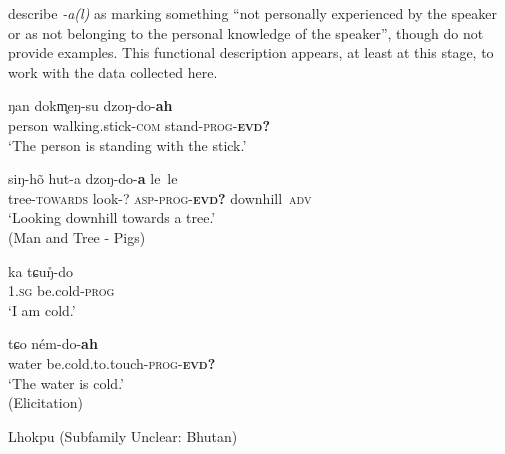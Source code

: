 \cite[20-21]{Grollmann2018} describe \textit{-a(l)} as marking something ``not personally experienced by the speaker or as not belonging to the personal knowledge of the speaker'', though do not provide examples. This functional description appears, at least at this stage, to work with the data collected here.

\begin{exe}
\ex\label{e:Methods:LhokpuVerbal}
\begin{xlist}
\ex \label{e:Methods:LhokpuVerbal:coda}
\gll ŋan dokm̥eŋ-su dzoŋ-do-\textbf{ah} \\
person walking.stick-\textsc{com} stand-\textsc{prog-\textbf{evd?}} \\
\glt `The person is standing with the stick.'

\ex \label{e:Methods:LhokpuVerbal:nocoda}
\gll siŋ-hõ hut-a dzoŋ-do-\textbf{a} le~le \\
tree-\textsc{towards} look-? \textsc{asp-prog-\textbf{evd?}} downhill~\textsc{adv} \\
\glt `Looking downhill towards a tree.' \\
(Man and Tree - Pigs)

\ex \label{e:Methods:LhokpuVerbal:cold}
\gll ka tɕuŋ̊-do \\
\textsc{1.sg} be.cold-\textsc{prog} \\
\glt `I am cold.'

\ex \label{e:Methods:LhokpuVerbal:coldevid}
\gll tɕo ném-do-\textbf{ah} \\
water be.cold.to.touch-\textsc{prog-\textbf{evd?}} \\
\glt `The water is cold.' \\
(Elicitation)


\end{xlist}
Lhokpu (Subfamily Unclear: Bhutan)
\end{exe}

